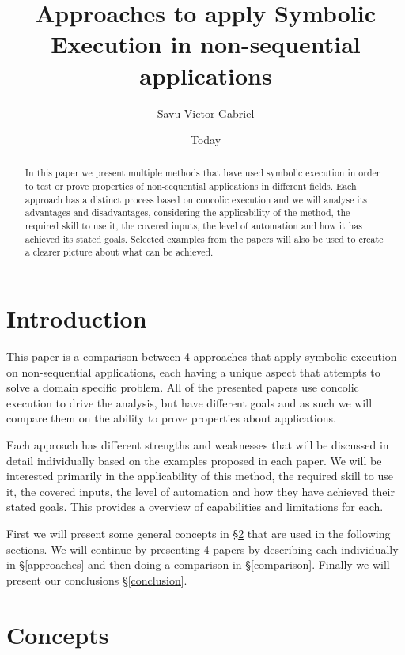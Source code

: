 \documentclass[10pt]{llncs}
\begin{document}
\title{Approaches to apply Symbolic Execution in non-sequential applications}
\author{Savu Victor-Gabriel}
\date{Today}
\maketitle

\begin{abstract}
	In this paper we present multiple methods that have used symbolic execution in order to test or prove properties of non-sequential applications in different fields. Each approach has a distinct process based on concolic execution and we will analyse its advantages and disadvantages, considering the applicability of the method, the required skill to use it, the covered inputs, the level of automation and how it has achieved its stated goals. Selected examples from the papers will also be used to create a clearer picture about what can be achieved.
\end{abstract}

\section{Introduction}

This paper is a comparison between 4 approaches that apply symbolic execution on non-sequential applications, each having a unique aspect that attempts to solve a domain specific problem. All of the presented papers use concolic execution to drive the analysis, but have different goals and as such we will compare them on the ability to prove properties about applications.

Each approach has different strengths and weaknesses that will be discussed in detail individually based on the examples proposed in each paper. We will be interested primarily in the applicability of this method, the required skill to use it, the covered inputs, the level of automation and how they have achieved their stated goals. This provides a overview of capabilities and limitations for each.

First we will present some general concepts in §\ref{concepts} that are used in the following sections. We will continue by presenting 4 papers \cite{base3, base4, base5, base7} by describing each individually in §\ref{approaches} and then doing a comparison in §\ref{comparison}. Finally we will present our conclusions §\ref{conclusion}.

\section{Concepts}
\label{concepts}
\end{document}
